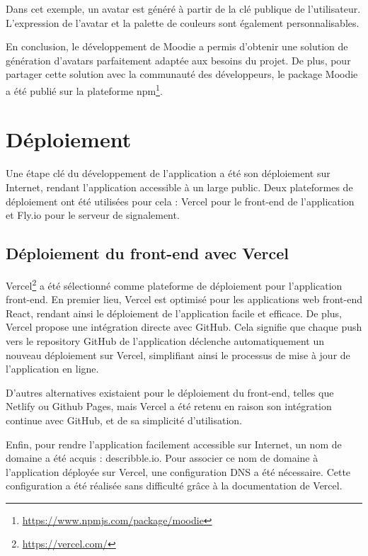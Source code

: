 Dans cet exemple, un avatar est généré à partir de la clé publique de l'utilisateur. L'expression de l'avatar et la palette de couleurs sont également personnalisables.

En conclusion, le développement de Moodie a permis d'obtenir une solution de génération d'avatars parfaitement adaptée aux besoins du projet. De plus, pour partager cette solution avec la communauté des développeurs, le package Moodie a été publié sur la plateforme \gls{npm}\footnote{\url{https://www.npmjs.com/package/moodie}}.

\section{Déploiement}

Une étape clé du développement de l'application a été son déploiement sur Internet, rendant l'application accessible à un large public. Deux plateformes de déploiement ont été utilisées pour cela : Vercel pour le front-end de l'application et Fly.io pour le serveur de signalement.

\subsection{Déploiement du front-end avec Vercel}

Vercel\footnote{\url{https://vercel.com/}} a été sélectionné comme plateforme de déploiement pour l'application front-end. En premier lieu, Vercel est optimisé pour les applications web front-end React, rendant ainsi le déploiement de l'application facile et efficace. De plus, Vercel propose une intégration directe avec GitHub. Cela signifie que chaque push vers le repository GitHub de l'application déclenche automatiquement un nouveau déploiement sur Vercel, simplifiant ainsi le processus de mise à jour de l'application en ligne.

D'autres alternatives existaient pour le déploiement du front-end, telles que Netlify ou Github Pages, mais Vercel a été retenu en raison son intégration continue avec GitHub, et de sa simplicité d'utilisation.

Enfin, pour rendre l'application facilement accessible sur Internet, un nom de domaine a été acquis : describble.io. Pour associer ce nom de domaine à l'application déployée sur Vercel, une configuration \gls{DNS} a été nécessaire. Cette configuration a été réalisée sans difficulté grâce à la documentation de Vercel.

